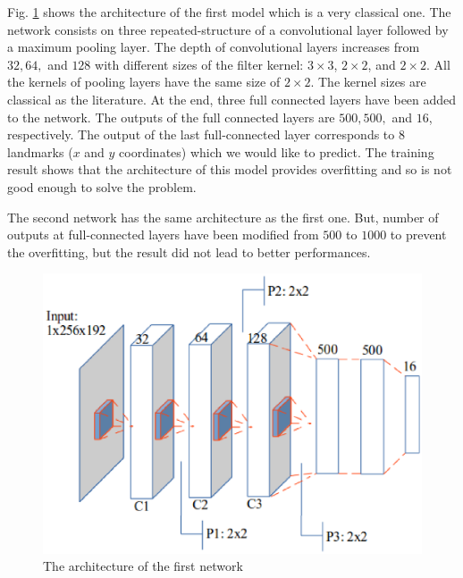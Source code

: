 \documentclass[conference]{IEEEtran}
\begin{document}
Fig. \ref{figarch0} shows the architecture of the first model which is a very classical one. The network consists on three repeated-structure of a convolutional layer followed by a maximum pooling layer. The depth of convolutional layers increases from $32, 64,$ and $128$ with different sizes of the filter kernel: $3 \times 3$, $2 \times 2$, and $2 \times 2$. All the kernels of pooling layers have the same size of $2 \times 2$. The kernel sizes are classical as the literature. At the end, three full connected layers have been added to the network. The outputs of the full connected layers are $500, 500,$ and $16$, respectively. The output of the last full-connected layer corresponds to 8 landmarks ($x$ and $y$ coordinates) which we would like to predict. The training result shows that the architecture of this model provides overfitting and so is not good enough to solve the problem.

The second network has the same architecture as the first one. But, number of outputs at full-connected layers have been modified from $500$ to $1000$ to prevent the overfitting, but the result did not lead to better performances. 

\begin{figure}[htbp]
	\centerline{\includegraphics[scale=0.47]{images/architecture1.eps}}
	\caption{The architecture of the first network}
	\label{figarch0}
\end{figure}
\end{document}

